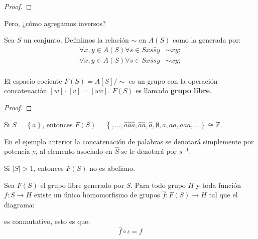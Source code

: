 \documentclass[12pt]{report}
\newcounter{it}
\theoremstyle{largebreak}
\newcommand\abs[1]{\ensuremath{\left|#1\right|}}
\newcommand\cf[3]{\ensuremath{#1:#2\rightarrow#3}}
\begin{document}
    \begin{proof}
        
    \end{proof}

    Pero, ¿cómo agregamos inversos?

    \begin{mydef}
        Sea $S$ un conjunto. Definimos la relación $\sim$ en $A(S)$ como la generada por:
        \begin{equation*}
            \begin{split}
                \forall x,y\in A(S)\forall s\in S xs\hat{s}y&\sim xy;\\
                \forall x,y\in A(S)\forall s\in S x\hat{s}sy&\sim xy;\\
            \end{split}
        \end{equation*}
    \end{mydef}

    \begin{propo}
        El espacio cociente $F(S)=A[S]/\sim$ es un grupo con la operación concatenación $[w]\cdot[v]=[wv]$. $F(S)$ es llamado \textbf{grupo libre}.
    \end{propo}

    \begin{proof}
        
    \end{proof}

    \begin{exa}
        Si $S=\left\{a\right\}$, entonces $F(S)=\left\{,...,\hat{a}\hat{a}\hat{a},\hat{a}\hat{a},\hat{a},\emptyset,a,aa,aaa,... \right\}\cong\mathbb{Z}$.
    \end{exa}

    En el ejemplo anterior la concatenación de palabras se denotará simplemente por potencia y, al elemento asociado en $\hat{S}$ se le denotará por $s^{-1}$.

    \begin{exa}
        Si $\abs{S}>1$, entonces $F(S)$ no es abeliano.
    \end{exa}
    
    \begin{propo}
        Sea $F(S)$ el grupo libre generado por $S$. Para todo grupo $H$ y toda función $\cf{f}{S}{H}$ existe un único homomorfismo de grupos $\cf{\hat{f}}{F(S)}{H}$ tal que el diagrama:
        
        es conmutativo, esto es que:
        \begin{equation*}
            \hat{f}\circ\iota=f
        \end{equation*}
    \end{propo}
\end{document}
